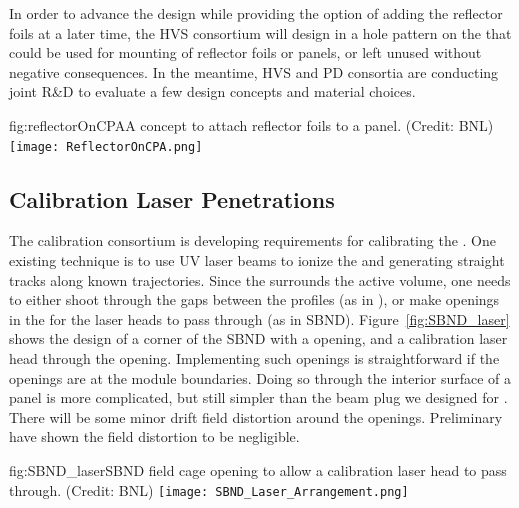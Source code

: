 In order to advance the  design while providing the option of adding the reflector foils at a later time, the HVS consortium will design in a hole pattern 
on the %
 that could be used for mounting of reflector foils or panels, or left unused without negative consequences. In the meantime, HVS and PD consortia are conducting joint R\&D to evaluate a few design concepts and material choices. 


\begin{dunefigure}{fig:reflectorOnCPA}{A concept to attach reflector foils to a  panel. (Credit: BNL)}
\texttt{[image: ReflectorOnCPA.png]}
\end{dunefigure}

\subsection{Calibration Laser Penetrations}

The calibration consortium is developing requirements for calibrating the  \efield.  One existing technique is to use UV laser beams to ionize the  and generating straight tracks along known trajectories.  Since the  surrounds the  active volume, one needs to either shoot through the gaps between the  profiles (as in \microboone), or make openings in the   for the laser heads to pass through (as in SBND).    Figure~\ref{fig:SBND_laser}  shows the design of a corner of the SBND  with a   opening, and a calibration laser head through the opening.  Implementing such openings is straightforward if the openings are at the   module boundaries.  Doing so through the interior surface of a  panel is more complicated, but still simpler than the beam plug we designed for .  There will be some minor drift field distortion around the openings.  Preliminary  have shown the field distortion to be negligible. 

\begin{dunefigure}{fig:SBND_laser}{SBND field cage opening to allow a calibration laser head to pass through. (Credit: BNL)}
\texttt{[image: SBND\_Laser\_Arrangement.png]}
\end{dunefigure}


